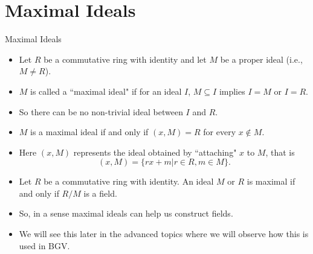 \documentclass[ %
 10pt, xcolor={dvipsnames,svgnames,x11names,hyperref},
   hyperref={colorlinks=true,citecolor=green,linkcolor=DarkRed,urlcolor=ProcessBlue,anchorcolor=blue}
  ]{beamer}
\newenvironment{stepitemize}{\begin{itemize}[<+->]}{\end{itemize} }
\begin{document}
\section{Maximal Ideals}
\begin{frame}{Maximal Ideals}
    \begin{stepitemize}
        \item Let $R$ be a commutative ring with identity and let $M$ be a proper ideal (i.e., $M \neq R$).
        \item $M$ is called a ``maximal ideal" if for an ideal $I$, $M\subseteq I$ implies $I=M$ or $I=R$.
\item So there can be no non-trivial ideal between $I$ and $R$.
\item  $M$ is a maximal ideal if and only if $(x,M)=R$ for every $x\not \in M$.
\item Here $(x,M)$ represents the ideal obtained by ``attaching" $x$ to $M$, that is
$$(x,M) = \{rx+m|r\in R, m\in M\}.$$
\item Let $R$ be a commutative ring with identity. An ideal $M$ or $R$ is maximal if and only if $R/M$ is a field.
\item So, in a sense maximal ideals can help us construct fields.
\item We will see this later in the advanced topics where we will observe how this is used in BGV.
\end{stepitemize}
\end{frame}
\end{document}
